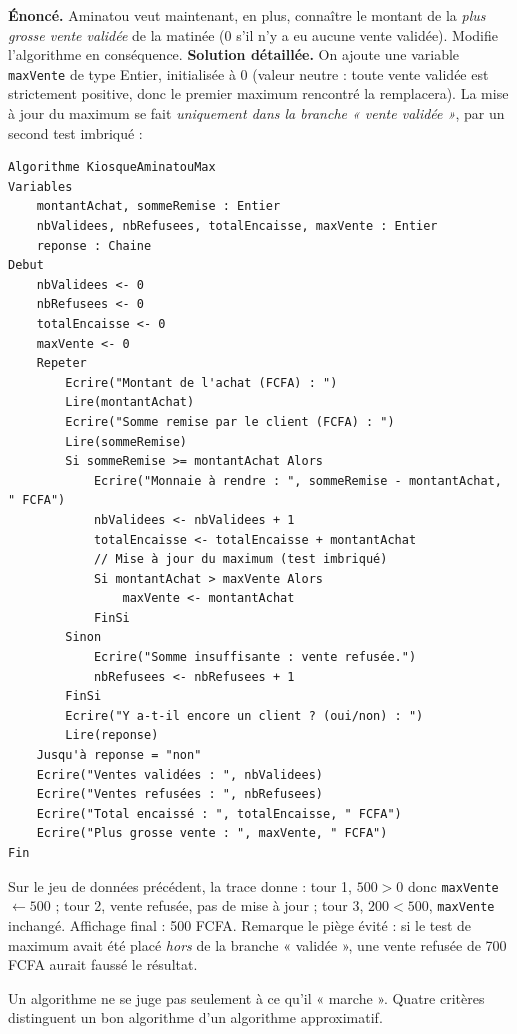 \documentclass[11pt]{article}
\newcounter{popsec}
\newcounter{popsub}
\newcommand{\courssub}[1]{%
  \stepcounter{popsub}%
  \par\vspace{9pt}\noindent{\popxbold\fontsize{11.5}{13}\selectfont\color{popink}{\color{poporange}\thepopsec.\thepopsub}\hspace{6pt}#1}\par\nopagebreak\vspace{4pt}
}
\begin{document}
\begin{exoresolu}
\textbf{Énoncé.} Aminatou veut maintenant, en plus, connaître le montant de la \emph{plus grosse vente validée} de la matinée (0 s'il n'y a eu aucune vente validée). Modifie l'algorithme en conséquence.
\tcblower
\textbf{Solution détaillée.} On ajoute une variable \texttt{maxVente} de type Entier, initialisée à 0 (valeur neutre : toute vente validée est strictement positive, donc le premier maximum rencontré la remplacera). La mise à jour du maximum se fait \emph{uniquement dans la branche « vente validée »}, par un second test imbriqué :
\begin{lstlisting}
Algorithme KiosqueAminatouMax
Variables
    montantAchat, sommeRemise : Entier
    nbValidees, nbRefusees, totalEncaisse, maxVente : Entier
    reponse : Chaine
Debut
    nbValidees <- 0
    nbRefusees <- 0
    totalEncaisse <- 0
    maxVente <- 0
    Repeter
        Ecrire("Montant de l'achat (FCFA) : ")
        Lire(montantAchat)
        Ecrire("Somme remise par le client (FCFA) : ")
        Lire(sommeRemise)
        Si sommeRemise >= montantAchat Alors
            Ecrire("Monnaie à rendre : ", sommeRemise - montantAchat, " FCFA")
            nbValidees <- nbValidees + 1
            totalEncaisse <- totalEncaisse + montantAchat
            // Mise à jour du maximum (test imbriqué)
            Si montantAchat > maxVente Alors
                maxVente <- montantAchat
            FinSi
        Sinon
            Ecrire("Somme insuffisante : vente refusée.")
            nbRefusees <- nbRefusees + 1
        FinSi
        Ecrire("Y a-t-il encore un client ? (oui/non) : ")
        Lire(reponse)
    Jusqu'à reponse = "non"
    Ecrire("Ventes validées : ", nbValidees)
    Ecrire("Ventes refusées : ", nbRefusees)
    Ecrire("Total encaissé : ", totalEncaisse, " FCFA")
    Ecrire("Plus grosse vente : ", maxVente, " FCFA")
Fin
\end{lstlisting}
Sur le jeu de données précédent, la trace donne : tour 1, $500 > 0$ donc \texttt{maxVente} $\leftarrow 500$ ; tour 2, vente refusée, pas de mise à jour ; tour 3, $200 < 500$, \texttt{maxVente} inchangé. Affichage final : 500 FCFA. Remarque le piège évité : si le test de maximum avait été placé \emph{hors} de la branche « validée », une vente refusée de 700 FCFA aurait faussé le résultat.
\end{exoresolu}

\courssub{Les critères d'un bon algorithme}

Un algorithme ne se juge pas seulement à ce qu'il « marche ». Quatre critères distinguent un bon algorithme d'un algorithme approximatif.
\end{document}

